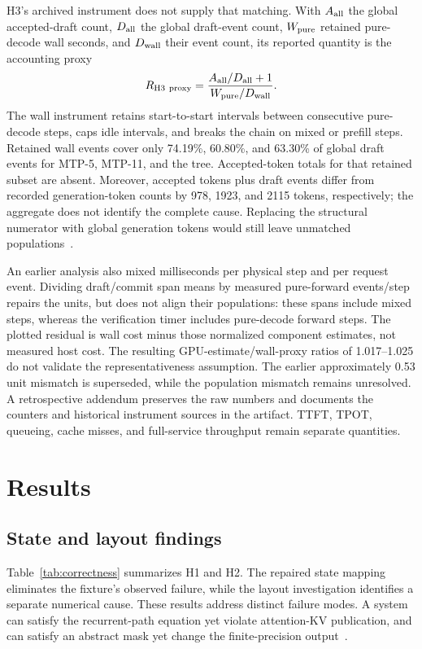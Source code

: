 \documentclass[conference]{IEEEtran}
\begin{document}
H3's archived instrument does not supply that matching. With $A_{\rm all}$ the global accepted-draft count, $D_{\rm all}$ the global draft-event count, $W_{\rm pure}$ retained pure-decode wall seconds, and $D_{\rm wall}$ their event count, its reported quantity is the accounting proxy
\begin{equation}
R_{\mathrm{H3\ proxy}}=
\frac{A_{\rm all}/D_{\rm all}+1}{W_{\rm pure}/D_{\rm wall}}.
\label{eq:rate}
\end{equation}
The wall instrument retains start-to-start intervals between consecutive pure-decode steps, caps idle intervals, and breaks the chain on mixed or prefill steps. Retained wall events cover only 74.19\%, 60.80\%, and 63.30\% of global draft events for MTP-5, MTP-11, and the tree. Accepted-token totals for that retained subset are absent. Moreover, accepted tokens plus draft events differ from recorded generation-token counts by 978, 1923, and 2115 tokens, respectively; the aggregate does not identify the complete cause. Replacing the structural numerator with global generation tokens would still leave unmatched populations~\cite{lumo2026archive}.

An earlier analysis also mixed milliseconds per physical step and per request event. Dividing draft/commit span means by measured pure-forward events/step repairs the units, but does not align their populations: these spans include mixed steps, whereas the verification timer includes pure-decode forward steps. The plotted residual is wall cost minus those normalized component estimates, not measured host cost. The resulting GPU-estimate/wall-proxy ratios of 1.017--1.025 do not validate the representativeness assumption. The earlier approximately 0.53 unit mismatch is superseded, while the population mismatch remains unresolved. A retrospective addendum preserves the raw numbers and documents the counters and historical instrument sources in the artifact. TTFT, TPOT, queueing, cache misses, and full-service throughput remain separate quantities.

\section{Results}
\label{sec:results}
\subsection{State and layout findings}
Table~\ref{tab:correctness} summarizes H1 and H2. The repaired state mapping eliminates the fixture's observed failure, while the layout investigation identifies a separate numerical cause. These results address distinct failure modes. A system can satisfy the recurrent-path equation yet violate attention-KV publication, and can satisfy an abstract mask yet change the finite-precision output~\cite{lumo2026stateless,lumo2026spine}.
\end{document}
